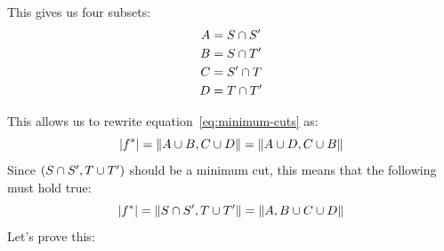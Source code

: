 This gives us four subsets:
\begin{align}
A &= S \cap S' \\
B &= S \cap T' \\
C &= S' \cap T \\
D &= T \cap T' 
\end{align}

This allows us to rewrite equation~\ref{eq:minimum-cuts} as:
\begin{equation}
|f^{*}| = \| A \cup B,  C \cup D \| = \| A \cup D, C \cup B \|
\label{eq:breaking-the-flow}
\end{equation}
Since $(S \cap S', T \cup T')$ should be a minimum cut, this means that the following must hold true:
\begin{equation}
|f^{*}| = \| S \cap S', T \cup T' \| = \| A, B \cup C \cup D \|
\label{eq:breaking-the-flow-intersect}
\end{equation}
Let's prove this:

